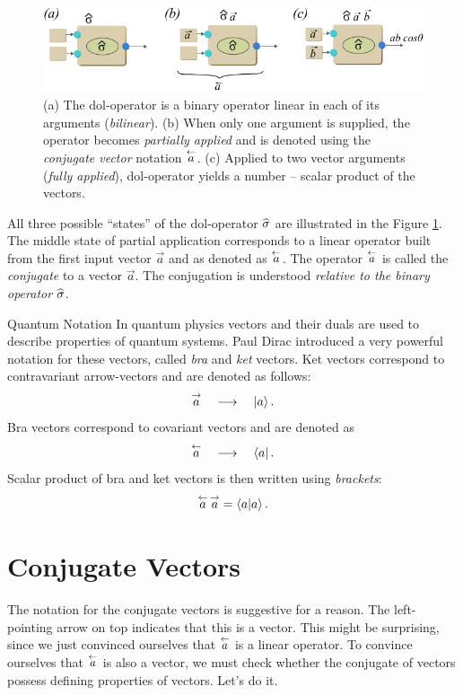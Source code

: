 \begin{figure}[htbp]
  \centering
  \includegraphics[scale=1.0]{doalPartialApplication}
  \caption{(a) The dol-operator is a binary operator linear in each of
    its arguments (\emph{bilinear}). (b) When only one argument is supplied, the
    operator becomes \emph{partially applied} and is denoted using the
    \emph{conjugate vector} notation $\overset{\leftarrow}{a}$. (c) Applied to two vector
    arguments (\emph{fully applied}), dol-operator yields a number
    -- scalar product of the vectors.}
  \label{fig:doalPartialApplication}
\end{figure}
All three possible ``states'' of the dol-operator $\widehat{\sigma}$ are
illustrated in the Figure \ref{fig:doalPartialApplication}. The middle
state of partial application corresponds to a linear operator built
from the first input vector $\vec{a}$ and as denoted as
$\overset{\leftarrow}{a}$. The operator $\overset{\leftarrow}{a}$ is called the \emph{conjugate}
to a vector $\vec{a}$. The conjugation is understood \emph{relative
to the binary operator} $\widehat{\sigma}$.
\begin{mybio}{Quantum Notation}
  In quantum physics vectors and their duals are used to describe
  properties of quantum systems. Paul Dirac introduced a very powerful
  notation for these vectors, called \emph{bra} and \emph{ket}
  vectors. Ket vectors correspond to contravariant arrow-vectors and
  are denoted as follows:
  \[
  \overset{\rightarrow}{a}\quad\longrightarrow\quad |{a}\rangle\,.
  \]
  Bra vectors correspond to covariant vectors and are denoted as
  \[
  \overset{\leftarrow}{a}\quad\longrightarrow\quad \langle{a}|\,.
  \]
  Scalar product of bra and ket vectors is then written using
  \emph{brackets}:
  \[
  \overset{\leftarrow}{a}\,\overset{\rightarrow}{a} = \langle a | a \rangle\,.
  \]
\end{mybio}


\section{Conjugate Vectors}\label{sec:conjugateVectors}

The notation for the conjugate vectors is
suggestive for a reason.
The left-pointing arrow on top indicates that this is a vector. This
might be surprising, since we just convinced ourselves that $\overset{\leftarrow}{a}$
is a linear operator. To
convince ourselves that $\overset{\leftarrow}{a}$ is also a vector, we must check
whether the conjugate of vectors possess defining properties of
vectors. Let's do it.

